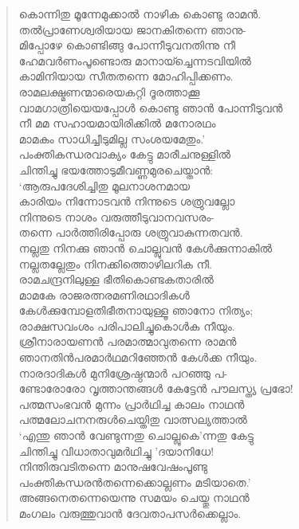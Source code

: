 \begin{verse}
കൊന്നിതു മൂന്നേമുക്കാല്‍ നാഴിക കൊണ്ടു രാമന്‍.\\
തല്‍പ്രാണേശ്വരിയായ ജാനകിതന്നെ ഞാനു-\\
മിപ്പോഴേ കൊണ്ടിങ്ങു പോന്നീടുവനതിന്നു നീ\\
ഹേമവര്‍ണംപൂണ്ടൊരു മാനായ്ച്ചെന്നടവിയില്‍\\
കാമിനിയായ സീതതന്നെ മോഹിപ്പിക്കണം.\\
രാമലക്ഷ്മണന്മാരെയകറ്റി ദൂരത്താക്കൂ\\
വാമഗാത്രിയെയപ്പോള്‍ കൊണ്ടു ഞാന്‍ \hbox{പോന്നീടുവന്‍}\\
നീ മമ സഹായമായിരിക്കില്‍ മനോരഥം\\
മാമകം സാധിച്ചീടുമില്ല സംശയമേതും.’\\
പംക്തികന്ധരവാക്യം കേട്ടു മാരീചനുള്ളില്‍\\
ചിന്തിച്ചു ഭയത്തോടുമീവണ്ണമുരചെയ്താന്‍:\\
‘ആരുപദേശിച്ചിതു മൂലനാശനമായ\\
കാരിയം നിന്നോടവന്‍ നിന്നുടെ ശത്രുവല്ലോ\\
നിന്നുടെ നാശം വരുത്തീടുവാനവസരം-\\
തന്നെ പാര്‍ത്തിരിപ്പോരു ശത്രുവാകുന്നതവന്‍.\\
നല്ലതു നിനക്കു ഞാന്‍ ചൊല്ലുവന്‍ കേള്‍ക്കുന്നാകില്‍\\
നല്ലതല്ലേതും നിനക്കിത്തൊഴിലറിക നീ.\\
രാമചന്ദ്രനിലുള്ള ഭീതികൊണ്ടകതാരില്‍\\
മാമകേ രാജരത്നരമണിരഥാദികള്‍\\
കേള്‍ക്കുമ്പോളതിഭീതനായുള്ളൂ ഞാനോ നിത്യം;\\
രാക്ഷസവംശം പരിപാലിച്ചുകൊള്‍ക നീയും.\\
ശ്രീനാരായണന്‍ പരമാത്മാവുതന്നെ രാമന്‍\\
ഞാനതിന്‍പരമാര്‍ഥമറിഞ്ഞേന്‍ കേള്‍ക്ക നീയും.\\
നാരദാദികള്‍ മുനിശ്രേഷ്ഠന്മാര്‍ പറഞ്ഞു പ-\\
ണ്ടോരോരോ വൃത്താന്തങ്ങള്‍ കേട്ടേന്‍ പൗലസ്ത്യ \hbox{പ്രഭോ!}\\
പത്മസംഭവന്‍ മുന്നം പ്രാര്‍ഥിച്ച കാലം നാഥന്‍\\
പത്മലോചനനരുള്‍ചെയ്തിതു വാത്സല്യത്താല്‍\\
‘എന്തു ഞാന്‍ വേണ്ടുന്നതു ചൊല്ലുകെ’ന്നതു കേട്ടു\\
ചിന്തിച്ചു വിധാതാവുമര്‍ഥിച്ചു ’ദയാനിധേ!\\
നിന്തിരുവടിതന്നെ മാനുഷവേഷംപൂണ്ടു\\
പംക്തികന്ധരന്‍തന്നെക്കൊല്ലണം മടിയാതെ.’\\
അങ്ങനെതന്നെയെന്നു സമയം ചെയ്തു നാഥന്‍\\
മംഗലം വരുത്തുവാന്‍ ദേവതാപസര്‍ക്കെല്ലാം.\\

\end{verse}
